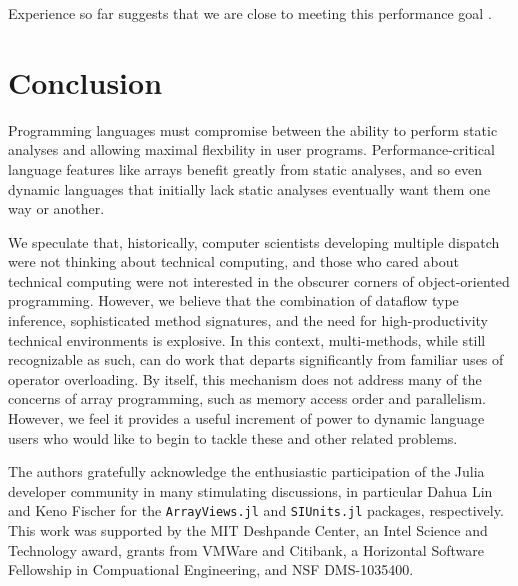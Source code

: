 \documentclass[preprint]{sigplanconf}
\newcommand{\code}[1]{\texttt{#1}}
\begin{document}
Experience so far suggests that we are close to meeting this
performance goal \cite{Bezanson:2012jf}.

\section{Conclusion}

Programming languages must compromise between the ability to perform
static analyses and allowing maximal flexbility in user programs.
Performance-critical language features like arrays benefit greatly from
static analyses, and so even dynamic languages that initially lack static
analyses eventually want them one way or another.

We speculate that, historically, computer scientists developing multiple 
dispatch were not thinking about technical computing, and those who cared
about technical computing were not interested in the obscurer corners of
object-oriented programming. However, we believe that the combination of
dataflow type inference, sophisticated method signatures, and the need for
high-productivity technical environments is explosive. In this context,
multi-methods, while still recognizable as such, can do work that departs
significantly from familiar uses of operator overloading. By itself, this
mechanism does not address many of the concerns of array programming, such
as memory access order and parallelism. However, we feel it provides a
useful increment of power to dynamic language users who would like to begin
to tackle these and other related problems.





\acks

The authors gratefully acknowledge the enthusiastic participation of the Julia
developer community in many stimulating discussions, in particular Dahua Lin and
Keno Fischer for the \code{ArrayViews.jl}\cite{Lin:2014av} and
\code{SIUnits.jl}\cite{Fischer:2014si} packages, respectively. This
work was supported by the MIT Deshpande Center, an Intel Science and
Technology award, grants from VMWare and Citibank, a Horizontal Software
Fellowship in Compuational Engineering, and NSF DMS-1035400.



{}

\end{document}
